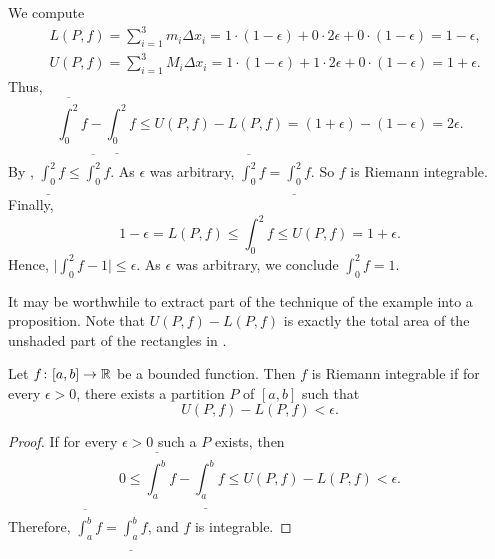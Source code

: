 \begin{example}
We compute
\begin{align*}
& L(P,f) = \sum_{i=1}^3 m_i \Delta x_i =
1 \cdot (1-\epsilon) + 0 \cdot 2\epsilon + 0 \cdot (1-\epsilon)
= 1-\epsilon , \\
& U(P,f) = \sum_{i=1}^3 M_i \Delta x_i =
1 \cdot (1-\epsilon) + 1 \cdot 2\epsilon + 0 \cdot (1-\epsilon)
= 1+\epsilon .
\end{align*}
Thus,
\begin{equation*}
\overline{\int_0^2} f - 
\underline{\int_0^2} f
\leq
U(P,f) - L(P,f)
=
(1+\epsilon)
- (1-\epsilon) = 2 \epsilon .
\end{equation*}
By , $\underline{\int_0^2} f \leq \overline{\int_0^2} f$.
As $\epsilon$ was arbitrary,
$\overline{\int_0^2} f = \underline{\int_0^2} f$.  So $f$ is Riemann
integrable.  Finally,
\begin{equation*}
1-\epsilon = L(P,f) \leq \int_0^2 f \leq U(P,f) =
1+\epsilon.
\end{equation*}
Hence, $\bigl\lvert \int_0^2 f - 1 \bigr\rvert \leq \epsilon$.  As $\epsilon$ was arbitrary,
we conclude $\int_0^2 f = 1$.
\end{example}

It may be worthwhile to extract part of the technique of the example into a
proposition.  Note that $U(P,f)-L(P,f)$ is exactly the total area of the
unshaded part of the rectangles in .

\begin{prop}
Let $f \colon [a,b] \to {\mathbb{R}}$ be a bounded function.  Then $f$ is Riemann
integrable if for every $\epsilon > 0$, there exists a partition $P$ of
$[a,b]$ such that
\begin{equation*}
U(P,f) - L(P,f) < \epsilon .
\end{equation*}
\end{prop}

\begin{proof}
If for every $\epsilon > 0$ such a $P$ exists, then
\begin{equation*}
0 \leq
\overline{\int_a^b} f - 
\underline{\int_a^b} f
\leq
U(P,f) - L(P,f) < \epsilon .
\end{equation*}
Therefore, 
$\overline{\int_a^b} f = \underline{\int_a^b} f$, and $f$ is integrable.
\end{proof}

